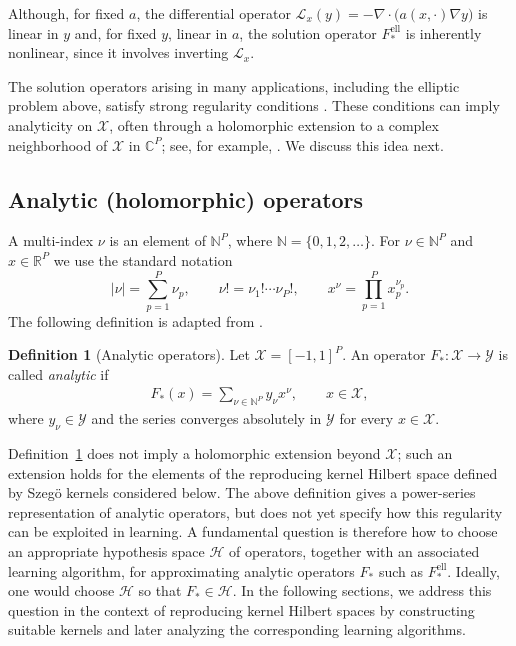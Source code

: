 \documentclass[11pt]{article}
\numberwithin{equation}{section}
\theoremstyle{plain}
\theoremstyle{definition}
\newtheorem{definition}[theorem]{Definition}
\theoremstyle{remark}
\newcommand{\X}{\mathcal{X}}
\newcommand{\Hs}{\mathcal{H}}
\newcommand{\abs}[1]{\left|#1\right|}
\begin{document}
Although, for fixed $a$, the differential operator
$\mathcal{L}_x(y)=-\nabla\cdot\bigl(a(x,\cdot)\nabla y\bigr)$
is linear in $y$ and, for fixed $y$, linear in $a$, the solution operator
$F_*^{\mathrm{ell}}$ is inherently nonlinear, since it involves inverting
$\mathcal{L}_x$.

The solution operators arising in many applications, including the elliptic
problem above, satisfy strong regularity conditions
\cite{cohen2010convergence, cohen2011analytic}. These conditions can imply
analyticity on $\mathcal{X}$, often through a holomorphic extension to a
complex neighborhood of $\mathcal{X}$ in $\mathbb{C}^P$; see, for example,
\cite{adcock2024learning}. We discuss this idea next.

\subsection{Analytic (holomorphic) operators}

A multi-index $\nu$ is an element of $\mathbb{N}^P$, where
$\mathbb{N}=\{0,1,2,\ldots\}$. For $\nu\in \mathbb{N}^P$ and $x\in\mathbb{R}^P$ we use the standard notation
\[
\abs{\nu}=\sum_{p=1}^P\nu_p,
\qquad
\nu!=\nu_1!\cdots\nu_P!,\qquad
x^\nu=\prod_{p=1}^P x_p^{\nu_p}.
\]
The following definition is adapted from
\cite{cohen2010convergence, cohen2011analytic}.

\begin{definition}[Analytic operators]\label{def:analytic_op}
Let $\mathcal{X}=[-1,1]^P$. An operator
$F_*\colon\mathcal{X}\to\mathcal{Y}$ is called \textit{analytic} if
\begin{align} \label{eq:analytic_op}
F_*(x)=\sum_{\nu\in\mathbb{N}^P}y_\nu x^\nu,
\qquad x\in\mathcal{X},
\end{align}
where $y_\nu\in\mathcal{Y}$ and the series converges absolutely in
$\mathcal{Y}$ for every $x\in\mathcal{X}$.
\end{definition}

Definition~\ref{def:analytic_op} does not imply a holomorphic extension beyond $\X$; such an extension holds for the elements of the reproducing kernel Hilbert space defined by  Szegö kernels  considered below. The above definition gives a power-series representation of analytic operators,
but does not yet specify how this regularity can be exploited in learning. A
fundamental question is therefore how to choose an appropriate hypothesis
space $\Hs$ of operators, together with an associated learning algorithm, for
approximating analytic operators $F_*$ such as $F_*^{\mathrm{ell}}$. Ideally,
one would choose $\Hs$ so that $F_*\in\Hs$. In the following sections, we
address this question in the context of reproducing kernel Hilbert spaces by
constructing suitable kernels and later analyzing the corresponding learning
algorithms.
\end{document}
